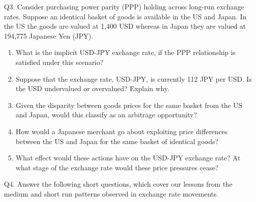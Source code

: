 \documentclass[12pt]{article}
\begin{document}
\noindent Q3. Consider purchasing power parity (PPP) holding across long-run exchange rates.
Suppose an identical basket of goods is available in the US and Japan. In the US the goods are valued at 1,400 USD whereas in Japan they are valued at 194,775 Japanese Yen (JPY).

\begin{enumerate}[1)]
	\item What is the implicit USD-JPY exchange rate, if the PPP relationship is satisfied under this scenario?
	
	\newpage
	
	\item Suppose that the exchange rate, USD-JPY, is currently 112 JPY per USD. Is the USD undervalued or overvalued? Explain why.
	
	\vspace{1.5in}
	
	\item Given the disparity between goods prices for the same basket from the US and Japan, would this classify as an arbitrage opportunity?  
	
	
	\vspace{1.5in}
	
	\item How would a Japanese merchant go about exploiting price differences between the US and Japan for the same basket of identical goods?
	
	\vspace{1.5in}
	
	
	\item What effect would these actions have on the USD-JPY exchange rate? At what stage of the exchange rate would these price pressures cease?
	
	\vspace{1.5in}
	
\end{enumerate}

\noindent Q4. Answer the following short questions, which cover our lessons from the medium and short run patterns observed in exchange rate movements.
\end{document}
